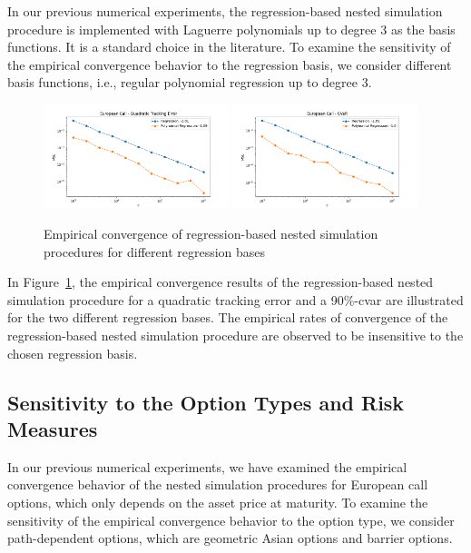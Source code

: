 In our previous numerical experiments, the regression-based nested simulation procedure is implemented with Laguerre polynomials up to degree $3$ as the basis functions.
It is a standard choice in the literature.
To examine the sensitivity of the empirical convergence behavior to the regression basis, we consider different basis functions, i.e., regular polynomial regression up to degree $3$.

\begin{figure}[ht!] 
    \centering
    \includegraphics[width=0.48\textwidth]{./project1/figures/figure13a.png}
    \includegraphics[width=0.48\textwidth]{./project1/figures/figure13b.png}
    \caption{Empirical convergence of regression-based nested simulation procedures for different regression bases}
\label{fig1:sens_basis}
\end{figure}

In Figure~\ref{fig1:sens_basis}, the empirical convergence results of the regression-based nested simulation procedure for a quadratic tracking error and a 90\%-\gls{cvar} are illustrated for the two different regression bases.
The empirical rates of convergence of the regression-based nested simulation procedure are observed to be insensitive to the chosen regression basis.

\subsection{Sensitivity to the Option Types and Risk Measures}\label{sec1:sensitivity-option-type}

In our previous numerical experiments, we have examined the empirical convergence behavior of the nested simulation procedures for European call options, which only depends on the asset price at maturity.
To examine the sensitivity of the empirical convergence behavior to the option type, we consider path-dependent options, which are geometric Asian options and barrier options.

